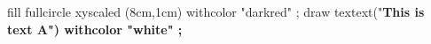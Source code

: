 \startMPpage
fill fullcircle xyscaled (8cm,1cm) withcolor "darkred" ;
draw textext("\bf This is text A") withcolor "white" ;
\stopMPpage
